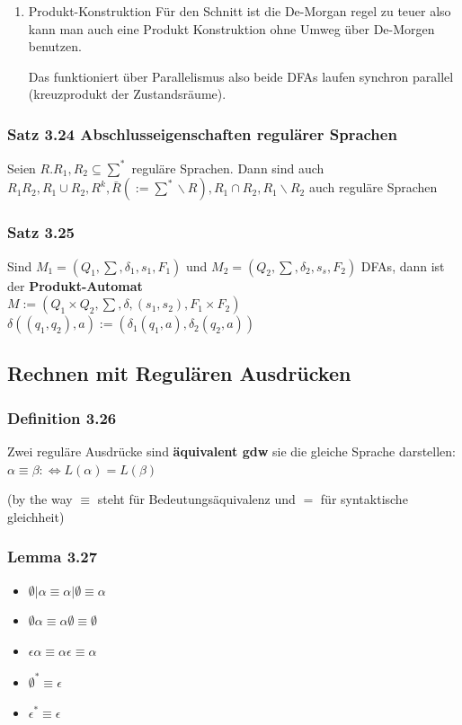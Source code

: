 \documentclass[11pt]{article}
\begin{document}
\begin{enumerate}
\item Produkt-Konstruktion
\label{sec:org8104222}
Für den Schnitt ist die De-Morgan regel zu teuer also kann man auch eine Produkt Konstruktion ohne Umweg über De-Morgen benutzen.

Das funktioniert über Parallelismus also beide DFAs laufen synchron parallel (kreuzprodukt der Zustandsräume).
\end{enumerate}

\subsubsection{Satz 3.24 Abschlusseigenschaften regulärer Sprachen}
\label{sec:orgd13c406}
Seien \(R. R_1,R_2 \subseteq \sum^*\) reguläre Sprachen. Dann sind auch
\(R_1R_2, R_1 \cup R_2, R^k, \bar{R} (:= \sum^* \backslash R), R_1 \cap R_2, R_1 \backslash R_2\) auch reguläre Sprachen

\subsubsection{Satz 3.25}
\label{sec:orgebc0dfc}
Sind \(M_1 = (Q_1, \sum,\delta_1,s_1,F_1)\) und \(M_2 = (Q_2,\sum,\delta_2,s_s, F_2)\) DFAs, dann ist der \textbf{Produkt-Automat}\\
\indent\indent\indent\indent \(M := (Q_1 \times Q_2, \sum, \delta, (s_1,s_2), F_1 \times F_2)\) \\
\indent\indent\indent\indent \(\delta((q_1,q_2), a) := (\delta_1(q_1, a), \delta_2(q_2, a))\)

\subsection{Rechnen mit Regulären Ausdrücken}
\label{sec:org0ef4328}
\subsubsection{Definition 3.26}
\label{sec:orgea87ee1}
Zwei reguläre Ausdrücke sind \textbf{äquivalent gdw} sie die gleiche Sprache darstellen:
\(\alpha \equiv \beta: \Leftrightarrow L(\alpha) = L(\beta)\)

(by the way \(\equiv\) steht für Bedeutungsäquivalenz und \(=\) für syntaktische gleichheit)

\subsubsection{Lemma 3.27}
\label{sec:org2dd5447}
\begin{itemize}
\item \(\emptyset | \alpha \equiv \alpha | \emptyset \equiv \alpha\)
\item \(\emptyset \alpha \equiv \alpha\emptyset \equiv \emptyset\)
\item \(\epsilon\alpha \equiv \alpha\epsilon \equiv \alpha\)
\item \(\emptyset^* \equiv \epsilon\)
\item \(\epsilon^* \equiv \epsilon\)
\end{itemize}
\end{document}

